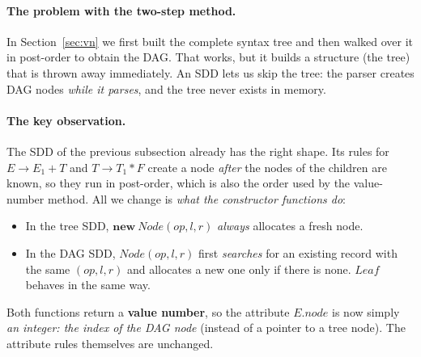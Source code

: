 \documentclass[11pt,a4paper]{article}
\newcommand{\at}[2]{\ensuremath{#1.\mathit{#2}}}
\begin{document}
\paragraph{The problem with the two-step method.} In Section~\ref{sec:vn} we first built the complete syntax tree and then walked over it in post-order to obtain the DAG. That works, but it builds a structure (the tree) that is thrown away immediately. An SDD lets us skip the tree: the parser creates DAG nodes \emph{while it parses}, and the tree never exists in memory.

\paragraph{The key observation.} The SDD of the previous subsection already has the right shape. Its rules for $E \to E_1 + T$ and $T \to T_1 * F$ create a node \emph{after} the nodes of the children are known, so they run in post-order, which is also the order used by the value-number method. All we change is \emph{what the constructor functions do}:
\begin{itemize}[nosep]
\item In the tree SDD, $\mathbf{new}\ \mathit{Node}(op, l, r)$ \emph{always} allocates a fresh node.
\item In the DAG SDD, $\mathit{Node}(op, l, r)$ first \emph{searches} for an existing record with the same $(op, l, r)$ and allocates a new one only if there is none. $\mathit{Leaf}$ behaves in the same way.
\end{itemize}
Both functions return a \textbf{value number}, so the attribute $\at{E}{node}$ is now simply \emph{an integer: the index of the DAG node} (instead of a pointer to a tree node). The attribute rules themselves are unchanged.
\end{document}
